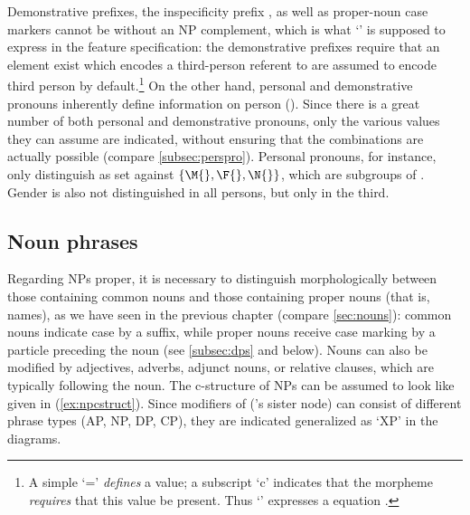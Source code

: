 \xe

Demonstrative prefixes, the inspecificity prefix , as well as 
proper-noun case markers cannot be without an NP complement, which is what 
`\req{}' is supposed to express in the feature specification: the demonstrative 
prefixes require that an element exist which encodes a third-person referent to 
are assumed to encode third person by default.\footnote{A simple `=' 
\emph{defines} a value; a subscript `c' indicates that the morpheme 
\emph{requires} that this value be present. Thus `\req{}' expresses a 
 equation \citep[59--61]{bresnan2016}.} On the other hand, 
personal and demonstrative pronouns inherently define information on person 
(\Pers{}). Since there is a great number of both personal and demonstrative 
pronouns, only the various values they can assume are indicated, without 
ensuring that the combinations are actually possible (compare 
\autoref{subsec:perspro}). Personal pronouns, for instance, only distinguish 
\Inan{} as set against $\{\M{}, \F{}, \N{}\}$, which are subgroups of \An{}. 
Gender is also not distinguished in all persons, but only in the third.

\subsection{Noun phrases}

Regarding NPs proper, it is necessary to distinguish morphologically between 
those containing common nouns and those containing proper nouns (that is,  
names), as we have seen in the previous chapter (compare \autoref{sec:nouns}): 
common nouns indicate case by a suffix, while proper nouns receive case marking 
by a particle preceding the noun (see \autoref{subsec:dps} and below). Nouns 
can also be modified by adjectives, adverbs, adjunct nouns, or relative 
clauses, which are typically following the noun. The c-structure of NPs can be 
assumed to look like given in (\ref{ex:npcstruct}). Since modifiers of 
 ('s sister node) can consist of different phrase types (AP, 
NP, DP, CP), they are indicated generalized as `XP' in the diagrams.

